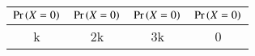  \begin{tabular}{|c|c|c|c|}
	\hline
	$\Pr\left(X=0\right)$ & $\Pr\left(X=0\right)$ & $\Pr\left(X=0\right)$ & $\Pr\left(X=0\right)$ \\
	\hline
	k & 2k & 3k & 0 \\
	\hline
\end{tabular}